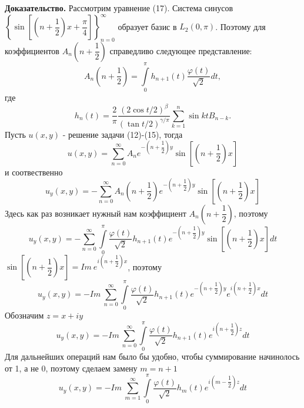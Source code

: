 \documentclass[12pt, a4paper]{article}
\begin{document}
\textbf{Доказательство.} 
	\newline
	Рассмотрим уравнение (17). Система синусов $\left\{\sin{\left[\left(n +\dfrac12\right)x + \dfrac\pi4\right]}\right\}_{n=0}^{\infty}$ образует базис в $L_2(0,\pi)$. Поэтому для коэффициентов $A_n\left(n+\dfrac12\right)$ справедливо следующее представление:
	\begin{equation*}
		A_n\left(n+\dfrac12\right) = \int\limits_0^\pi h_{n+1}(t) \dfrac{\varphi(t)}{\sqrt2} dt, 
	\end{equation*}
	где
	\begin{equation*}
		h_n(t) = \dfrac{2}{\pi}\dfrac{(2\cos{t/2})^\beta}{(\tan{t/2})^{\gamma/\pi}} \sum\limits_{k=1}^n \sin{kt} B_{n-k}.
	\end{equation*}
	Пусть $u(x,y)$ - решение задачи (12)-(15), тогда
	\begin{equation*}
		u(x,y) = \sum\limits_{n=0}^{\infty} A_n e^{-\left(n + \dfrac12\right)y} \sin{\left[\left(n + \dfrac12\right)x\right]}
	\end{equation*}
	и соотвественно
	\begin{equation*}
		u_y(x,y) = -\sum\limits_{n=0}^{\infty} A_n \left(n +\dfrac12\right) e^{-\left(n + \dfrac12\right)y} \sin{\left[\left(n + \dfrac12\right)x\right]}
	\end{equation*}
	Здесь как раз возникает нужный нам коэффициент $A_n \left(n+\dfrac12\right)$, поэтому
	\begin{equation*}
		u_y(x,y)  = - \sum\limits_{n=0}^{\infty}  \int\limits_0^\pi \dfrac{\varphi(t)}{\sqrt2}  h_{n+1}(t)  e^{-\left(n + \dfrac12\right)y} \sin{\left[\left(n + \dfrac12\right)x\right]} dt
	\end{equation*}
	$\sin{\left[\left(n + \dfrac12\right)x\right]} = Im \ e^{i\left(n + \dfrac12\right)x}$, поэтому
	\begin{equation*}
		u_y(x,y)  = -  Im \ \sum\limits_{n=0}^{\infty}  \int\limits_0^\pi \dfrac{\varphi(t)}{\sqrt2}  h_{n+1}(t)  e^{-\left(n + \dfrac12\right)y} e^{i\left(n + \dfrac12\right)x} dt
	\end{equation*}
	Обозначим $z = x + iy$
	\begin{equation*}
		u_y(x,y)  = -  Im \ \sum\limits_{n=0}^{\infty}  \int\limits_0^\pi \dfrac{\varphi(t)}{\sqrt2}  h_{n+1}(t)  e^{i\left(n+\dfrac12\right) z}  dt
	\end{equation*}
	Для дальнейших операций нам было бы удобно, чтобы суммирование начинолось от 1, а не 0, поэтому сделаем замену $m = n +1$
	\begin{equation*}
		u_y(x,y)  = -  Im \ \sum\limits_{m=1}^{\infty}  \int\limits_0^\pi \dfrac{\varphi(t)}{\sqrt2}  h_{m}(t)  e^{i\left(m-\dfrac12\right) z}  dt
	\end{equation*}
\end{document}
